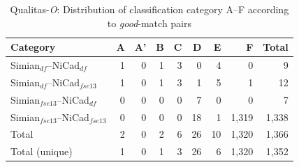 \documentclass{IEEEtran}
\begin{document}

\begin{table}[H]
	\centering
	\caption{Qualitas-\textit{O}: Distribution of classification category A--F according to \textit{good}-match pairs}
	\label{tab:good_classification}
	\begin{tabular}{|l|r|r|r|r|r|r|r|r|}
		\hline 
		Category   & A   & 	A'   & 	B   & C   & D   &	E   &	F   & Total  \\
		\hline
		Simian$_{df}$--NiCad$_{df}$   & 1 & 0 & 1 & 3 & 0 & 4 & 0 & 9 \\
		Simian$_{df}$--NiCad$_{fse13}$   & 1 & 0 & 1 & 3 & 1 & 5 & 1 & 12 \\
		Simian$_{fse13}$--NiCad$_{df}$   & 0 & 0 & 0 & 0 & 7 & 0 & 0 & 7 \\
		Simian$_{fse13}$--NiCad$_{fse13}$   & 0 & 0 & 0 & 0 & 18 & 1 & 1,319 & 1,338 \\
		\hline
		Total   &   2   &   0   &  2   &  6   &   26   &   10   & 1,320  & 1,366 \\
		Total (unique)  &   1   &   0   &  1   &  3   &   26   &   6   & 1,320  & 1,352 \\
		\hline
	\end{tabular} 
\end{table}
\end{document}
